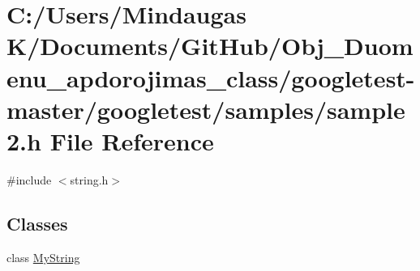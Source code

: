 \hypertarget{googletest-master_2googletest_2samples_2sample2_8h}{}\section{C\+:/\+Users/\+Mindaugas K/\+Documents/\+Git\+Hub/\+Obj\+\_\+\+Duomenu\+\_\+apdorojimas\+\_\+class/googletest-\/master/googletest/samples/sample2.h File Reference}
\label{googletest-master_2googletest_2samples_2sample2_8h}
{\ttfamily \#include $<$string.\+h$>$}\newline
\subsection*{Classes}
\begin{DoxyCompactItemize}
\item 
class \mbox{\hyperlink{class_my_string}{My\+String}}
\end{DoxyCompactItemize}
